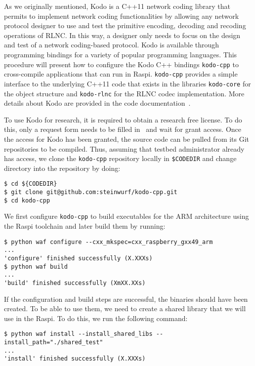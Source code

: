 As we originally mentioned, Kodo is a C++11 network coding library that
permits to implement network coding functionalities by allowing any network
protocol designer to use and test the primitive encoding, decoding and
recoding operations of \ac{RLNC}. In this way, a designer only needs to
focus on the design and test of a network coding-based protocol. Kodo is
available through programming bindings for a variety of popular
programming languages. This procedure will present how to configure the
Kodo C++ bindings \texttt{kodo-cpp} to cross-compile applications that can
run in \ac{Raspi}. \texttt{kodo-cpp} provides a simple interface to the
underlying C++11 code that exists in the libraries \texttt{kodo-core} for
the object structure and \texttt{kodo-rlnc} for the \ac{RLNC} codec
implementation. More details about Kodo are provided in the code
documentation~\cite{kodocppdoc}.

To use Kodo for research, it is required to obtain a research free license.
To do this, only a request form needs to be filled
in~\cite{steinwurflicenselink} and wait for grant access. Once
the access for Kodo has been granted, the source code can be pulled from
its Git repositories to be compiled. Thus, assuming that testbed
administrator already has access, we clone the \texttt{kodo-cpp}
repository locally in \texttt{\${CODEDIR}} and change directory into
the repository by doing:

\begin{lstlisting}[]
$ cd ${CODEDIR}
$ git clone git@github.com:steinwurf/kodo-cpp.git
$ cd kodo-cpp
\end{lstlisting}
\FloatBarrier
\vspace{-5mm}

We first configure \texttt{kodo-cpp} to build executables for the
\ac{ARM} architecture using the \ac{Raspi} toolchain and later build them
by running:
\begin{lstlisting}[]
$ python waf configure --cxx_mkspec=cxx_raspberry_gxx49_arm
...
'configure' finished successfully (X.XXXs)
$ python waf build
...
'build' finished successfully (XmXX.XXs)
\end{lstlisting}
\FloatBarrier
\vspace{-5mm}

If the configuration and build steps are successful, the binaries should
have been created. To be able to use them, we need to create a shared library
that we will use in the \ac{Raspi}. To do this, we run the following command:

\begin{lstlisting}[]
$ python waf install --install_shared_libs --install_path="./shared_test"
...
'install' finished successfully (X.XXXs)
\end{lstlisting}
\FloatBarrier
\vspace{-5mm}

